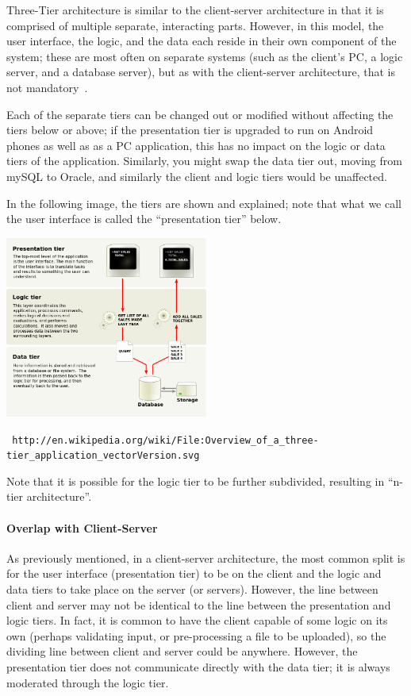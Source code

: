 Three-Tier architecture is similar to the client-server architecture in that it is comprised of multiple separate, interacting parts. However, in this model, the user interface, the logic, and the data each reside in their own component of the system; these are most often on separate systems (such as the client's PC, a logic server, and a database server), but as with the client-server architecture, that is not mandatory~\cite{threeTier}. 


Each of the separate tiers can be changed out or modified without affecting the tiers below or above; if the presentation tier is upgraded to run on Android phones as well as as a PC application, this has no impact on the logic or data tiers of the application. Similarly, you might swap the data tier out, moving from mySQL to Oracle, and similarly the client and logic tiers would be unaffected.

In the following image, the tiers are shown and explained; note that what we call the user interface is called the ``presentation tier'' below.

\begin{center}
	\includegraphics[width=0.5\textwidth]{images/threetier.png}
	
	\texttt{\small
 http://en.wikipedia.org/wiki/File:Overview\_of\_a\_three-tier\_application\_vectorVersion.svg}
\end{center}


Note that it is possible for the logic tier to be further subdivided, resulting in ``n-tier architecture''.

\paragraph{Overlap with Client-Server} As previously mentioned, in a client-server architecture, the most common split is for the user interface (presentation tier) to be on the client and the logic and data tiers to take place on the server (or servers). However, the line between client and server may not be identical to the line between the presentation and logic tiers. In fact, it is common to have the client capable of some logic on its own (perhaps validating input, or pre-processing a file to be uploaded), so the dividing line between client and server could be anywhere. However, the presentation tier does not communicate directly with the data tier; it is always moderated through the logic tier.

